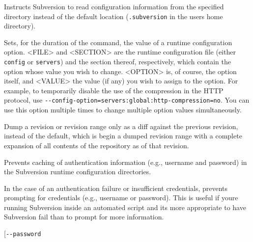 \begin{description}
\item[\protect{}\label{svn.ref.svnrdump.sw.config_dir}{}\texttt{-\/-config-dir}
\textless DIR\textgreater{}]
Instructs Subversion to read configuration information from the
specified directory instead of the default location
(\texttt{.subversion} in the user\textquotesingle s home directory).
\item[\protect{}\label{svn.ref.svnrdump.sw.config_option}{}\texttt{-\/-config-option}
\textless FILE\textgreater:\textless SECTION\textgreater:\textless OPTION\textgreater={[}\textless VALUE\textgreater{]}]
Sets, for the duration of the command, the value of a runtime
configuration option. \textless FILE\textgreater{} and
\textless SECTION\textgreater{} are the runtime configuration file
(either \texttt{config} or \texttt{servers}) and the section thereof,
respectively, which contain the option whose value you wish to change.
\textless OPTION\textgreater{} is, of course, the option itself, and
\textless VALUE\textgreater{} the value (if any) you wish to assign to
the option. For example, to temporarily disable the use of the
compression in the HTTP protocol, use
\texttt{-\/-config-option=servers:global:http-compression=no}. You can
use this option multiple times to change multiple option values
simultaneously.
\item[\protect{}\label{svn.ref.svnrdump.sw.incremental}{}\texttt{-\/-incremental}]
Dump a revision or revision range only as a diff against the previous
revision, instead of the default, which is begin a dumped revision range
with a complete expansion of all contents of the repository as of that
revision.
\item[\protect{}\label{svn.ref.svnrdump.sw.no_auth_cache}{}\texttt{-\/-no-auth-cache}]
Prevents caching of authentication information (e.g., username and
password) in the Subversion runtime configuration directories.
\item[\protect{}\label{svn.ref.svnrdump.sw.non_interactive}{}\texttt{-\/-non-interactive}]
In the case of an authentication failure or insufficient credentials,
prevents prompting for credentials (e.g., username or password). This is
useful if you\textquotesingle re running Subversion inside an automated
script and it\textquotesingle s more appropriate to have Subversion fail
than to prompt for more information.
\item[\protect{}\label{svn.ref.svnrdump.sw.password}{}\texttt{-\/-password}

\end{description}
